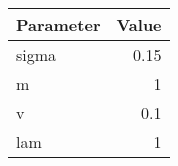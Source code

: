 \begin{tabular}{lr}
\hline
 Parameter   &   Value \\
\hline
 sigma       &    0.15 \\
 m           &    1    \\
 v           &    0.1  \\
 lam         &    1    \\
\hline
\end{tabular}